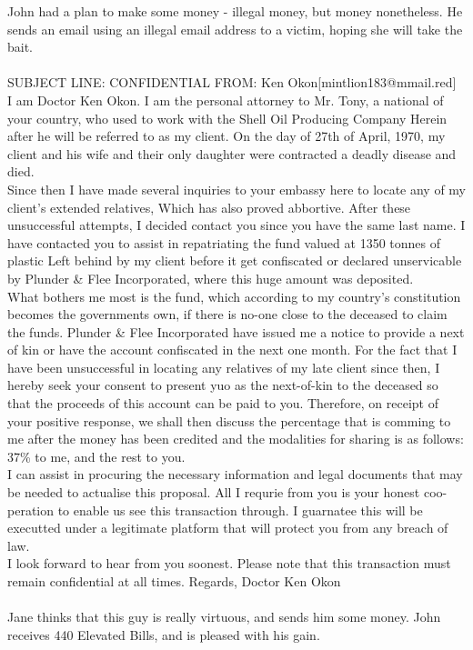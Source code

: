 \documentclass{article}
\begin{document}
John had a plan to make some money {-} illegal money, but money nonetheless.
He sends an email using an illegal email address to a victim, hoping she will take the bait.
\\\\
SUBJECT LINE: CONFIDENTIAL
FROM: Ken Okon[mintlion183@mmail.red]
\\
I am Doctor Ken Okon.
I am the personal attorney to Mr. Tony, a national of your country, who used to work with the Shell Oil Producing Company
Herein after he will be referred to as my client.
On the day of 27th of April, 1970, my client and his wife and their only daughter were contracted a deadly disease and died.
\\
Since then I have made several inquiries to your embassy here to locate any of my client's extended relatives, Which has also proved abbortive.
After these unsuccessful attempts, I decided contact you since you have the same last name.
I have contacted you to assist in repatriating the fund valued at 1350 tonnes of plastic Left behind by my client before it get confiscated or declared unservicable by Plunder \& Flee Incorporated, where this huge amount was deposited.
\\
What bothers me most is the fund, which according to my country's constitution becomes the governments own, if there is no{-}one close to the deceased to claim the funds.
Plunder \& Flee Incorporated have issued me a notice to provide a next of kin or have the account confiscated in the next one month.
For the fact that I have been unsuccessful in locating any relatives of my late client since then, I hereby seek your consent to present yuo as the next{-}of{-}kin to the deceased so that the proceeds of this account can be paid to you.
Therefore, on receipt of your positive response, we shall then discuss the percentage that is comming to me after the money has been credited and the modalities for sharing is as follows: 37\% to me, and the rest to you.
\\
I can assist in procuring the necessary information and legal documents that may be needed to actualise this proposal.
All I requrie from you is your honest coo{-}peration to enable us see this transaction through.
I guarnatee this will be executted under a legitimate platform that will protect you from any breach of law.
\\
I look forward to hear from you soonest.
Please note that this transaction must remain confidential at all times.
Regards, Doctor Ken Okon
\\\\
Jane thinks that this guy is really virtuous, and sends him some money.
John receives 440 Elevated Bills, and is pleased with his gain.
\end{document}
